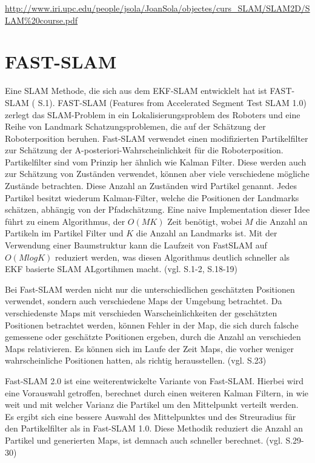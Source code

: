 \url{http://www.iri.upc.edu/people/jsola/JoanSola/objectes/curs_SLAM/SLAM2D/SLAM%20course.pdf}

\section{FAST-SLAM}
Eine SLAM Methode, die sich aus dem EKF-SLAM entwicklelt hat ist FAST-SLAM (\cite{orb_slam} S.1). FAST-SLAM (Features from Accelerated Segment Test SLAM 1.0) zerlegt das SLAM-Problem in ein Lokalisierungsproblem des Roboters und eine Reihe von Landmark Schatzungsproblemen, die auf der Schätzung der Roboterposition beruhen. Fast-SLAM verwendet einen modifizierten Partikelfilter zur Schätzung der \glqq A-posteriori-Wahrscheinlichkeit\grqq{}  für die Roboterposition. Partikelfilter sind vom Prinzip her ähnlich wie Kalman Filter. Diese werden auch zur Schätzung von Zuständen verwendet, können aber viele verschiedene mögliche Zustände betrachten. Diese Anzahl an Zuständen wird Partikel genannt. Jedes Partikel besitzt wiederum Kalman-Filter, welche die Positionen der Landmarks schätzen, abhängig von der Pfadschätzung. Eine naive Implementation dieser Idee führt zu einem Algorithmus, der \(O(MK)\) Zeit benötigt, wobei \(M\) die Anzahl an Partikeln im Partikel Filter und \( K\) die Anzahl an Landmarks ist. Mit der Verwendung einer Baumstruktur kann die Laufzeit von FastSLAM auf \(O(MlogK)\) reduziert werden, was diesen Algorithmus deutlich schneller als EKF basierte SLAM ALgortihmen macht. (vgl. \cite{ekf_problems} S.1-2, \cite{slam_studi} S.18-19)

Bei Fast-SLAM werden nicht nur die unterschiedlichen geschätzten Positionen verwendet, sondern auch verschiedene Maps der Umgebung betrachtet. Da verschiedenste Maps mit verschieden Warscheinlichkeiten der geschätzten Positionen betrachtet werden, können Fehler in der Map, die sich durch falsche gemessene oder geschätzte Positionen ergeben, durch die Anzahl an verschieden Maps relativieren. Es können sich im Laufe der Zeit Maps, die vorher weniger wahrscheinliche Positionen hatten, als richtig herausstellen. (vgl.  \cite{slam_studi} S.23)

Fast-SLAM 2.0 ist eine weiterentwickelte Variante von Fast-SLAM. Hierbei wird eine Vorauswahl getroffen, berechnet durch einen weiteren Kalman Filtern, in wie weit und mit welcher Varianz die Partikel um den Mittelpunkt verteilt werden. Es ergibt sich eine bessere Auswahl des Mittelpunktes und des Streuradius für den Partikelfilter als in Fast-SLAM 1.0. Diese Methodik reduziert die Anzahl an Partikel und generierten Maps, ist demnach auch schneller berechnet. (vgl. \cite{slam_studi} S.29-30)

